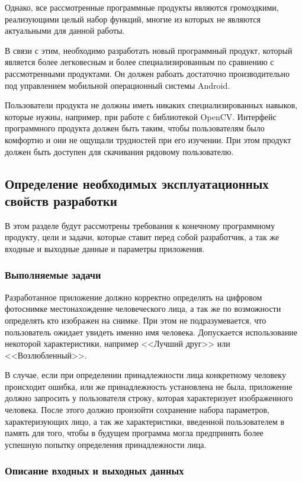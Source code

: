 Однако, все рассмотренные программные продукты являются громоздкими, реализующими
целый набор функций, многие из которых не являются актуальными
для данной работы.

В связи с этим, необходимо разработать новый программный продукт, который
является более легковесным и более специализированным по сравнению с
рассмотренными продуктами. Он должен рабоать достаточно производительно под
управлением мобильной операционный системы Android.

Пользователи продукта не должны иметь никаких специализированных навыков,
которые нужны, например, при работе с библиотекой OpenCV. Интерфейс
программного продукта должен быть таким, чтобы пользователям было комфортно
и они не ощущали трудностей при его изучении. При этом продукт должен быть
доступен для скачивания рядовому пользователю.

\subsection{Определение необходимых эксплуатационных свойств разработки}

В этом разделе будут рассмотрены требования к конечному программному продукту,
цели и задачи, которые ставит перед собой разработчик, а так же входные
и выходные данные и параметры приложения.

\subsubsection{Выполняемые задачи}

Разработанное приложение должно корректно определять на цифровом фотоснимке
местонахождение человеческого лица, а так же по возможности определять
кто изображен на снимке. При этом не подразумевается, что пользователь
ожидает увидеть именно имя человека. Допускается использование некоторой
характеристики, например <<Лучший друг>> или <<Возлюбленный>>.

В случае, если при определении принадлежности лица конкретному человеку 
происходит ошибка, или же принадлежность установлена не была, приложение должно
запросить у пользователя строку, которая характеризует изображенного человека.
После этого должно произойти сохранение набора параметров, характеризующих
лицо, а так же характеристики, введенной пользователем в память для того, чтобы
в будущем программа могла предпринять более успешную попытку определения
принадлежности лица.

\subsubsection{Описание входных и выходных данных}


